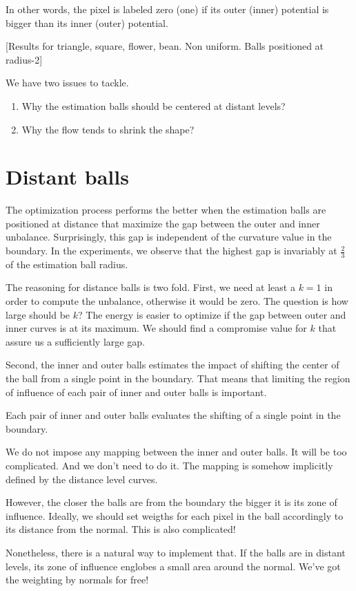 In other words, the pixel is labeled zero (one) if its outer (inner) potential is bigger than its inner (outer) potential.

[Results for triangle, square, flower, bean. Non uniform. Balls positioned at radius-2]


We have two issues to tackle. 
\begin{enumerate}
	\item{Why the estimation balls should be centered at distant levels?}
	\item{Why the flow tends to shrink the shape?}
\end{enumerate}


\section{Distant balls}
	The optimization process performs the better when the estimation balls are positioned at distance that maximize the gap between the outer and inner unbalance. Surprisingly, this gap is independent of the curvature value in the boundary. In the experiments, we observe that the highest gap is invariably at $\frac{2}{3}$ of the estimation ball radius.
	
	The reasoning for distance balls is two fold. First, we need at least a $k=1$ in order to compute the unbalance, otherwise it would be zero. The question is how large should be $k$? The energy is easier to optimize if the gap between outer and inner curves is at its maximum. We should find a compromise value for $k$ that assure us a sufficiently large gap. 
	
	Second, the inner and outer balls estimates the impact of shifting the center of the ball from a single point in the boundary. That means that limiting the region of influence of each pair of inner and outer balls is important.
	
	Each pair of inner and outer balls evaluates the shifting of a single point in the boundary.
	
	We do not impose any mapping between the inner and outer balls. It will be too complicated. And we don't need to do it. The mapping is somehow implicitly defined by the distance level curves. 
	
	However, the closer the balls are from the boundary the bigger it is its zone of influence. Ideally, we should set weigths for each pixel in the ball accordingly to its distance from the normal. This is also complicated! 
	
	Nonetheless, there is a natural way to implement that. If the balls are in distant levels, its zone of influence englobes a small area around the normal. We've got the weighting by normals for free!
	
